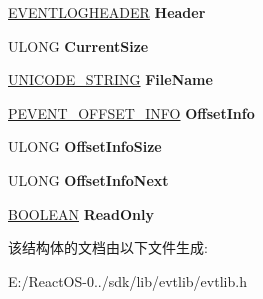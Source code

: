 \begin{DoxyCompactItemize}
\hyperlink{struct___e_v_e_n_t_l_o_g_h_e_a_d_e_r}{E\+V\+E\+N\+T\+L\+O\+G\+H\+E\+A\+D\+ER} {\bfseries Header}
\item 
\mbox{\label{struct___e_v_t_l_o_g_f_i_l_e_a325aadbe55aab830b08942f48e5af8a9}} 
U\+L\+O\+NG {\bfseries Current\+Size}
\item 
\mbox{\label{struct___e_v_t_l_o_g_f_i_l_e_a57268acf4ad2abf522ed382256dfc853}} 
\hyperlink{struct___u_n_i_c_o_d_e___s_t_r_i_n_g}{U\+N\+I\+C\+O\+D\+E\+\_\+\+S\+T\+R\+I\+NG} {\bfseries File\+Name}
\item 
\mbox{\label{struct___e_v_t_l_o_g_f_i_l_e_a9b8e4608aea5a1372000814c8ac52872}} 
\hyperlink{struct___e_v_e_n_t___o_f_f_s_e_t___i_n_f_o}{P\+E\+V\+E\+N\+T\+\_\+\+O\+F\+F\+S\+E\+T\+\_\+\+I\+N\+FO} {\bfseries Offset\+Info}
\item 
\mbox{\label{struct___e_v_t_l_o_g_f_i_l_e_a12834b2bbfc941c19cb2cb2e88d2fc74}} 
U\+L\+O\+NG {\bfseries Offset\+Info\+Size}
\item 
\mbox{\label{struct___e_v_t_l_o_g_f_i_l_e_a719a33de3f6eb6e745f30c9410e97e82}} 
U\+L\+O\+NG {\bfseries Offset\+Info\+Next}
\item 
\mbox{\label{struct___e_v_t_l_o_g_f_i_l_e_acd3b2f3b2552fb86e989caa5d23a60c5}} 
\hyperlink{_processor_bind_8h_a112e3146cb38b6ee95e64d85842e380a}{B\+O\+O\+L\+E\+AN} {\bfseries Read\+Only}
\end{DoxyCompactItemize}


该结构体的文档由以下文件生成\+:\begin{DoxyCompactItemize}
\item 
E\+:/\+React\+O\+S-\/0../sdk/lib/evtlib/evtlib.\+h\end{DoxyCompactItemize}
